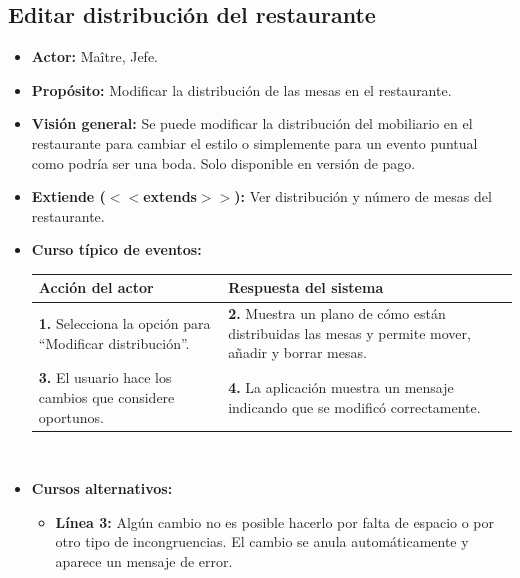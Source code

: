 \documentclass[spanish,a4paper,11pt, twoside]{report}	%
\begin{document}

		\subsection{Editar distribución del restaurante}
			\begin{itemize}
			\item \textbf{Actor:} Maître, Jefe.
			\item \textbf{Propósito:} Modificar la distribución de las mesas en el restaurante.
			\item \textbf{Visión general:} Se puede modificar la distribución del mobiliario
				en el restaurante para cambiar el estilo o simplemente para un evento puntual
				como podría ser una boda. Solo disponible en versión de pago.
			\item \textbf{Extiende ($<<$extends$>>$):} Ver distribución y número de mesas del restaurante.
			\item \textbf{Curso típico de eventos:} 	\\
			\begin{tabular}{|p{6cm}||p{6cm}|}
				\hline
				\textbf{Acción del actor} & \textbf{Respuesta del sistema} \\ \hline \hline
				\textbf{1.} Selecciona la opción para ``Modificar distribución''. & 
				\textbf{2.} Muestra un plano de cómo están distribuidas las mesas y permite mover, añadir y borrar mesas. \\ \hline
				\textbf{3.} El usuario hace los cambios que considere oportunos.	& 
				\textbf{4.} La aplicación muestra un mensaje indicando que se modificó correctamente. \\ \hline
			\end{tabular}
			\\
			\item \textbf{Cursos alternativos:} 
			\begin{itemize}
				\item  \textbf{Línea 3:} Algún cambio no es posible hacerlo por falta de espacio
					o por otro tipo de incongruencias. El cambio se anula automáticamente y aparece
					un mensaje de error.
			\end {itemize}
		\end {itemize}

\end{document}

